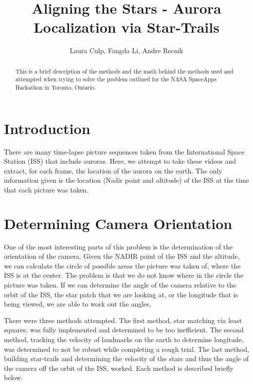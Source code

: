 \documentclass[12pt]{article}
\title{Aligning the Stars - Aurora Localization via Star-Trails}
\author{ Laura Culp, Fangda Li, Andre Recnik \\
}
\theoremstyle{definition}
\begin{document}
\maketitle
 
\begin{abstract}
This is a brief description of the methods and the math behind the methods used and attempted when trying to solve the problem outlined for the NASA SpaceApps Hackathon in Toronto, Ontario.
\end{abstract}

\break

\setcounter{equation}{0} \setcounter{section}{0}

\section{\bf Introduction }

There are many time-lapse picture sequences taken from the International Space Station (ISS) that include auroras.  Here, we attempt to take these videos and extract, for each frame, the location of the aurora on the earth.  The only information given is the location (Nadir point and altitude) of the ISS at the time that each picture was taken. 

\section{ \bf Determining Camera Orientation }

One of the most interesting parts of this problem is the determination of the orientation of the camera.  Given the NADIR point of the ISS and the altitude, we can calculate the circle of possible areas the picture was taken of, where the ISS is at the center.  The problem is that we do not know where in the circle the picture was taken.  If we can determine the angle of the camera relative to the orbit of the ISS, the star patch that we are looking at, or the longitude that is being viewed, we are able to work out the angles. 

There were three methods attempted.  The first method, star matching via least squares, was fully implemented and determined to be too inefficient.  The second method, tracking the velocity of landmarks on the earth to determine longitude, was determined to not be robust while completing a rough trial.  The last method, building star-trails and determining the velocity of the stars and thus the angle of the camera off the orbit of the ISS, worked.  Each method is described briefly below.
\end{document}
